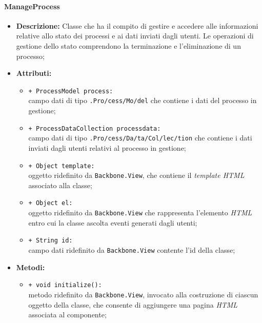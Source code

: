 \paragraph{ManageProcess}
\begin{flushleft}
\begin{itemize}
\item \textbf{Descrizione:} Classe che ha il compito di gestire e accedere alle informazioni relative allo stato dei processi e ai dati inviati dagli utenti. Le operazioni di gestione dello stato comprendono la terminazione e l'eliminazione di un processo;
\item \textbf{Attributi:}
\begin{sloppypar}
\begin{itemize}
\item \texttt{+ ProcessModel process:}\\ campo dati di tipo \texttt{\model{}.Pro\fshyp{}cess\fshyp{}Mo\fshyp{}del} che contiene i dati del processo in gestione;
\item \texttt{+ ProcessDataCollection processdata:}\\ campo dati di tipo \texttt{\collection{}.Pro\fshyp{}cess\fshyp{}Da\fshyp{}ta\fshyp{}Col\fshyp{}lec\fshyp{}tion} che contiene i dati inviati dagli utenti relativi al processo in gestione;
\item \texttt{+ Object template:}\\ oggetto ridefinito da \texttt{Backbone.View}, che contiene il \textit{template HTML} associato alla classe;
\item \texttt{+ Object el:}\\ oggetto ridefinito da \texttt{Backbone.View} che rappresenta l'elemento \textit{HTML} entro cui la classe ascolta eventi generati dagli utenti;
\item \texttt{+ String id:}\\ campo dati ridefinito da \texttt{Backbone.View} contente l'id della classe;
\end{itemize}
\end{sloppypar}
\item \textbf{Metodi:}
\begin{sloppypar}
\begin{itemize}
\item \texttt{+ void initialize():}\\ metodo ridefinito da \texttt{Backbone.View}, invocato alla costruzione di ciascun oggetto della classe, che consente di aggiungere una pagina \textit{HTML} associata al componente;

\end{itemize}
\end{sloppypar}
\end{itemize}
\end{flushleft}

